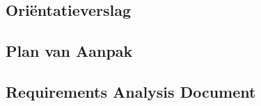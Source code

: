 
\subsection*{Ori\"{e}ntatieverslag}
\label{Orientatieverslag}

\subsection*{Plan van Aanpak}
\label{PvA}

\subsection*{Requirements Analysis Document}
\label{RAD}
